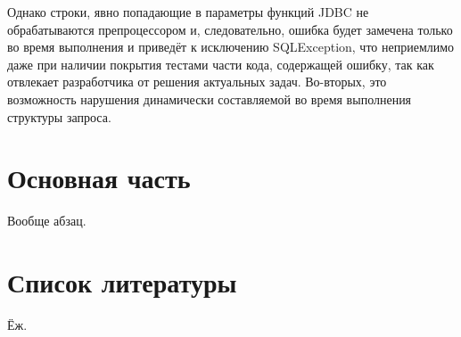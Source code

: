 \documentclass[12pt]{article}
\begin{document}
Однако строки, явно попадающие в параметры функций JDBC не обрабатываются препроцессором и, следовательно, ошибка будет замечена только во время выполнения и приведёт к исключению SQLException, что неприемлимо даже при наличии покрытия тестами части кода, содержащей ошибку, так как отвлекает разработчика от решения актуальных задач. Во-вторых, это возможность нарушения динамически составляемой во время выполнения структуры запроса.

\section{Основная часть}
Вообще абзац.

\section{Список литературы}
Ёж.
\end{document}

